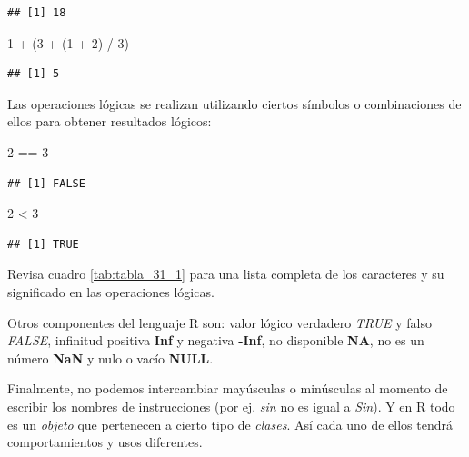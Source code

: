\documentclass[
]{book}
\newenvironment{Shaded}{\begin{snugshade}}{\end{snugshade}}
\newcommand{\DecValTok}[1]{\textcolor[rgb]{0.00,0.00,0.81}{#1}}
\newcommand{\NormalTok}[1]{#1}
\newcommand{\SpecialCharTok}[1]{\textcolor[rgb]{0.00,0.00,0.00}{#1}}
\begin{document}
\begin{verbatim}
## [1] 18
\end{verbatim}

\begin{Shaded}
\begin{Highlighting}[]
\DecValTok{1} \SpecialCharTok{+}\NormalTok{ (}\DecValTok{3} \SpecialCharTok{+}\NormalTok{ (}\DecValTok{1} \SpecialCharTok{+} \DecValTok{2}\NormalTok{) }\SpecialCharTok{/} \DecValTok{3}\NormalTok{)}
\end{Highlighting}
\end{Shaded}

\begin{verbatim}
## [1] 5
\end{verbatim}

Las operaciones lógicas se realizan utilizando ciertos símbolos o combinaciones de ellos para obtener resultados lógicos:

\begin{Shaded}
\begin{Highlighting}[]
\DecValTok{2} \SpecialCharTok{==} \DecValTok{3}
\end{Highlighting}
\end{Shaded}

\begin{verbatim}
## [1] FALSE
\end{verbatim}

\begin{Shaded}
\begin{Highlighting}[]
\DecValTok{2} \SpecialCharTok{\textless{}} \DecValTok{3}
\end{Highlighting}
\end{Shaded}

\begin{verbatim}
## [1] TRUE
\end{verbatim}

Revisa cuadro \ref{tab:tabla_31_1} para una lista completa de los caracteres y su significado en las operaciones lógicas.

Otros componentes del lenguaje R son: valor lógico verdadero \emph{TRUE} y falso \emph{FALSE}, infinitud positiva \textbf{Inf} y negativa \textbf{-Inf}, no disponible \textbf{NA}, no es un número \textbf{NaN} y nulo o vacío \textbf{NULL}.

Finalmente, no podemos intercambiar mayúsculas o minúsculas al momento de escribir los nombres de instrucciones (por ej. \emph{sin} no es igual a \emph{Sin}). Y en R todo es un \emph{objeto} que pertenecen a cierto tipo de \emph{clases}. Así cada uno de ellos tendrá comportamientos y usos diferentes.
\end{document}
